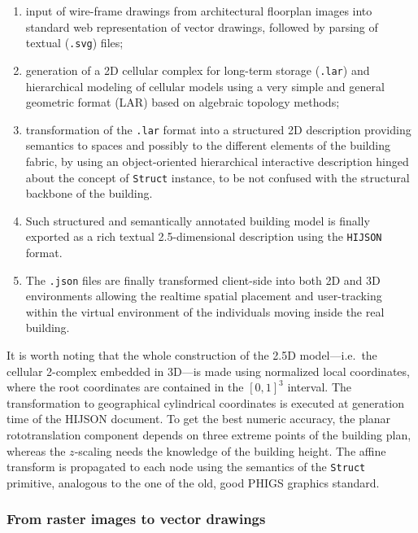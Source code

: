 \documentclass[]{egpubl}
\begin{document}
\begin{enumerate}
\def\labelenumi{(\alph{enumi})}
\item
  input of wire-frame drawings from architectural floorplan images into
  standard web representation of vector drawings, followed by parsing of textual (\texttt{.svg}) files;
\item
  generation of a 2D cellular complex for long-term storage
  (\texttt{.lar}) and hierarchical modeling of cellular models using a very simple and general geometric format (LAR) based on algebraic topology methods;
\item
  transformation of the \texttt{.lar} format into a structured 2D
  description providing semantics to spaces and possibly to the
  different elements of the building fabric, by using an object-oriented
  hierarchical interactive description hinged about the concept of
  \texttt{Struct} instance, to be not confused with the structural
  backbone of the building. 
\item
Such structured and semantically annotated
  building model is finally
  exported as a rich textual 2.5-dimensional description using the
  \texttt{HIJSON} format. 
\item
  The \texttt{.json} files are finally transformed client-side into both
  2D and 3D environments allowing the realtime spatial placement and
  user-tracking within the virtual environment of the individuals moving
  inside the real building.
\end{enumerate}

It is worth noting that the whole construction of the 2.5D model---i.e.~the cellular 2-complex embedded in 3D---is made using normalized local coordinates, where the root coordinates are contained in the $[0,1]^3$ interval. The transformation to geographical cylindrical coordinates is executed at generation time of the HIJSON document. To get the best numeric accuracy, the planar rototranslation component depends on three extreme points of the building plan, whereas the $z$-scaling needs the knowledge of the building height. The affine transform is propagated to each node using the semantics of the \texttt{Struct} primitive, analogous to the one of the old, good PHIGS graphics standard.




\subsubsection*{From raster images to vector drawings}
\end{document}
